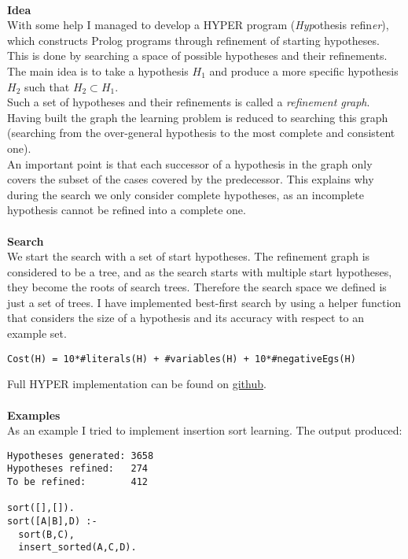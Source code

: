 \documentclass[11pt]{article}
\begin{document}
\paragraph{}
\textbf{Idea}\\
With some help I managed to develop a HYPER program (\emph{Hyp}othesis refin\emph{er}), which constructs Prolog programs through refinement of starting hypotheses. \\ This is done by searching a space of possible hypotheses and their refinements. The main idea is to take a hypothesis \emph{$H_1$} and produce a more specific hypothesis \emph{$H_2$} such that $H_2 \subset H_1$.\\
Such a set of hypotheses and their refinements is called a \emph{refinement graph}.\\Having built the graph the learning problem is reduced to searching this graph (searching from the over-general hypothesis to the most complete and consistent one).\\
An important point is that each successor of a hypothesis in the graph only covers the subset of the cases covered by the predecessor. This explains why during the search we only consider complete hypotheses, as an incomplete hypothesis cannot be refined into a complete one.
\paragraph{}
\textbf{Search}\\
We start the search with a set of start hypotheses. The refinement graph is considered to be a tree, and as the search starts with multiple start hypotheses, they become the roots of search trees. Therefore the search space we defined is just a set of trees. I have implemented best-first search by using a helper function that considers the size of a hypothesis and its accuracy with respect to an example set.
\begin{lstlisting}
Cost(H) = 10*#literals(H) + #variables(H) + 10*#negativeEgs(H)
\end{lstlisting} 
Full HYPER implementation can be found on \href{https://github.com/vitpro/ilp_alp_tal/blob/master/src/hyper.pl}{github}.

\paragraph{}
\textbf{Examples}\\
As an example I tried to implement insertion sort learning. The output produced:
\begin{lstlisting}
Hypotheses generated: 3658
Hypotheses refined:   274
To be refined:        412

sort([],[]).
sort([A|B],D) :-
  sort(B,C),
  insert_sorted(A,C,D).  
\end{lstlisting} 
\end{document}
